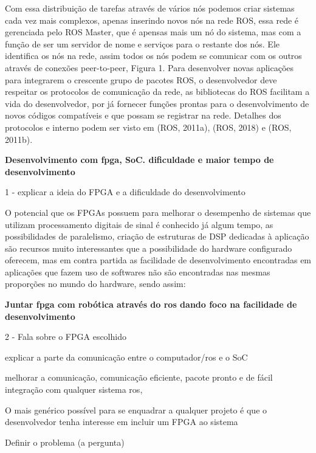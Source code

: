 Com essa distribuição de tarefas através de vários nós podemos criar sistemas cada
vez mais complexos, apenas inserindo novos nós na rede ROS, essa rede é gerenciada
pelo ROS Master, que é apensas mais um nó do sistema, mas com a função de ser um
servidor de nome e serviços para o restante dos nós. Ele identifica os nós na rede, assim
todos os nós podem se comunicar com os outros através de conexões peer-to-peer, Figura
1. Para desenvolver novas aplicações para integrarem o crescente grupo de pacotes ROS, o
desenvolvedor deve respeitar os protocolos de comunicação da rede, as bibliotecas do ROS
facilitam a vida do desenvolvedor, por já fornecer funções prontas para o desenvolvimento
de novos códigos compatíveis e que possam se registrar na rede. Detalhes dos protocolos e
interno podem ser visto em (ROS, 2011a), (ROS, 2018) e (ROS, 2011b).

\textbf{Desenvolvimento com fpga, SoC. dificuldade e maior tempo de desenvolvimento}

1 - explicar a ideia do FPGA e a dificuldade do desenvolvimento

 O potencial que os FPGAs possuem para melhorar o 
desempenho de sistemas que utilizam processamento digitais de sinal é conhecido já algum
tempo, as possibilidades de paralelismo, criação de estruturas de DSP dedicadas à aplicação
são recursos muito interessantes que a possibilidade do hardware configurado oferecem,
mas em contra partida as facilidade de desenvolvimento encontradas em aplicações que
fazem uso de softwares não são encontradas nas mesmas proporções no mundo do hardware,
sendo assim:

\textbf{Juntar fpga com robótica através do ros dando foco na facilidade de desenvolvimento}

2 - Fala sobre o FPGA escolhido

explicar a parte da comunicação entre o computador/ros e o SoC

melhorar a comunicação, comunicação eficiente, pacote pronto e de fácil integração com qualquer sistema 
ros,

O mais genérico possível para se enquadrar a qualquer projeto é que o desenvolvedor tenha
interesse em incluir um FPGA ao sistema


Definir o problema (a pergunta)

